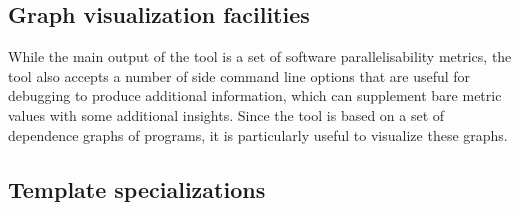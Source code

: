 \subsection{Graph visualization facilities} \label{ppar-tool-graph-visualizations}
\qquad While the main output of the tool is a set of software parallelisability metrics, the tool also accepts a number of side command line options that are useful for debugging to produce additional information, which can supplement bare metric values with some additional insights. Since the tool is based on a set of dependence graphs of programs, it is particularly useful to visualize these graphs.  

\subsection{Template specializations} \label{ppar-tool-template-specs}

